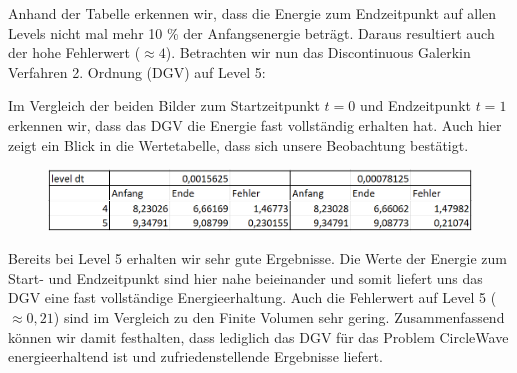 Anhand der Tabelle erkennen wir, dass die Energie zum Endzeitpunkt auf allen Levels nicht mal mehr 10 \% der Anfangsenergie beträgt. Daraus resultiert auch der hohe Fehlerwert ($\approx 4$). 
Betrachten wir nun das Discontinuous Galerkin Verfahren 2. Ordnung (DGV) auf Level 5:

\begin{figure}[H]
	\centering
\end{figure}

Im Vergleich der beiden Bilder zum Startzeitpunkt $t=0$ und Endzeitpunkt $t=1$ erkennen wir, dass das DGV die Energie fast vollständig erhalten hat. Auch hier zeigt ein Blick in die Wertetabelle, dass sich unsere Beobachtung bestätigt.

\begin{figure}[H]
	\centering
	\includegraphics[width=\textwidth]{../Aufgabe21/deg=2CircleWaveEnergieTabelle.png}
\end{figure}

Bereits bei Level 5 erhalten wir sehr gute Ergebnisse.
Die Werte der Energie zum Start- und Endzeitpunkt sind hier nahe beieinander und somit liefert uns das DGV eine fast vollständige Energieerhaltung. Auch die Fehlerwert auf Level 5 ($\approx 0,21$) sind im Vergleich zu den Finite Volumen sehr gering. Zusammenfassend können wir damit festhalten, dass lediglich das DGV für das Problem CircleWave energieerhaltend ist und zufriedenstellende Ergebnisse liefert.






